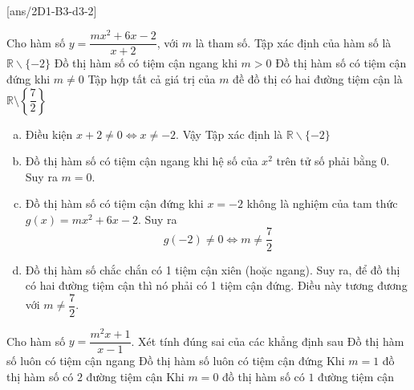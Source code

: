  \\
[ans/2D1-B3-d3-2]
\begin{ex}%
	Cho hàm số $y=\dfrac{mx^2+6x-2}{x+2}$, với $m$ là tham số.
	\choiceTF
	{\True Tập xác định của hàm số là $\mathbb{R}\backslash\{-2\}$}
	{Đồ thị hàm số có tiệm cận ngang khi $m>0$}
	{Đồ thị hàm số có tiệm cận đứng khi $m\ne 0$}
	{\True Tập hợp tất cả giá trị của $m$ đề đồ thị có hai đường tiệm cận là $\mathbb{R}\setminus\left\{\dfrac{7}{2}\right\}$}
	\loigiai
	{
		\begin{enumerate}[a)]
			\item Điều kiện $x+2 \ne 0 \Leftrightarrow x \ne -2$. Vậy Tập xác định là $\mathbb{R}\backslash\{-2\}$
			\item Đồ thị hàm số có tiệm cận ngang khi hệ số của $x^2$ trên tử số phải bằng 0. Suy ra $m=0$.
			\item Đồ thị hàm số có tiệm cận đứng khi $x=-2$ không là nghiệm của tam thức $g(x)=mx^2+6x-2$. Suy ra
			$$g(-2)\ne 0 \Leftrightarrow m \ne \dfrac{7}{2}$$
			\item Đồ thị hàm số chắc chắn có 1 tiệm cận xiên (hoặc ngang). Suy ra, để đồ thị có hai đường tiệm cận thì nó phải có 1 tiệm cận đứng. Điều này tương đương với $m \ne \dfrac{7}{2}$.
		\end{enumerate}
	}
\end{ex}
\begin{ex}%
    Cho hàm số $ y=\dfrac{m^2x+1}{x-1} $. Xét tính đúng sai của các khẳng định sau
    \choiceTF
    {\True Đồ thị hàm số luôn có tiệm cận ngang}
    {\True Đồ thị hàm số luôn có tiệm cận đứng}
    {\True Khi $ m=1$ đồ thị hàm số có $ 2 $ đường tiệm cận}
    {Khi $ m=0 $ đồ thị hàm số có $ 1 $ đường tiệm cận}
\end{ex}
